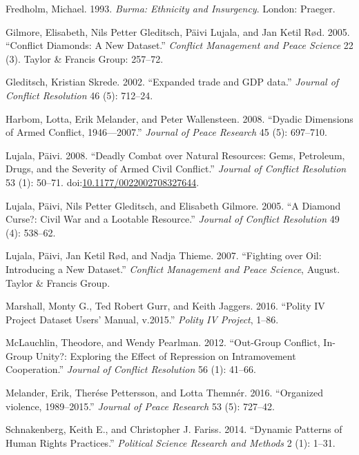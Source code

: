 \documentclass[12pt,]{book}
\theoremstyle{definition}
\theoremstyle{definition}
\theoremstyle{remark}
\begin{document}
\hypertarget{ref-Fredholm1993}{}
Fredholm, Michael. 1993. \emph{Burma: Ethnicity and Insurgency}. London:
Praeger.

\hypertarget{ref-Gilmore2007}{}
Gilmore, Elisabeth, Nils Petter Gleditsch, Päivi Lujala, and Jan Ketil
Rød. 2005. ``Conflict Diamonds: A New Dataset.'' \emph{Conflict
Management and Peace Science} 22 (3). Taylor \& Francis Group: 257--72.

\hypertarget{ref-Gleditsch2002b}{}
Gleditsch, Kristian Skrede. 2002. ``Expanded trade and GDP data.''
\emph{Journal of Conflict Resolution} 46 (5): 712--24.

\hypertarget{ref-Harbom2008}{}
Harbom, Lotta, Erik Melander, and Peter Wallensteen. 2008. ``Dyadic
Dimensions of Armed Conflict, 1946---2007.'' \emph{Journal of Peace
Research} 45 (5): 697--710.

\hypertarget{ref-Lujala2008}{}
Lujala, Päivi. 2008. ``Deadly Combat over Natural Resources: Gems,
Petroleum, Drugs, and the Severity of Armed Civil Conflict.''
\emph{Journal of Conflict Resolution} 53 (1): 50--71.
doi:\href{https://doi.org/10.1177/0022002708327644}{10.1177/0022002708327644}.

\hypertarget{ref-Lujala2005}{}
Lujala, Päivi, Nils Petter Gleditsch, and Elisabeth Gilmore. 2005. ``A
Diamond Curse?: Civil War and a Lootable Resource.'' \emph{Journal of
Conflict Resolution} 49 (4): 538--62.

\hypertarget{ref-Lujala2007}{}
Lujala, Päivi, Jan Ketil Rød, and Nadja Thieme. 2007. ``Fighting over
Oil: Introducing a New Dataset.'' \emph{Conflict Management and Peace
Science}, August. Taylor \& Francis Group.

\hypertarget{ref-Marshall2016}{}
Marshall, Monty G., Ted Robert Gurr, and Keith Jaggers. 2016. ``Polity
IV Project Dataset Users' Manual, v.2015.'' \emph{Polity IV Project},
1--86.

\hypertarget{ref-McLauchlin2012}{}
McLauchlin, Theodore, and Wendy Pearlman. 2012. ``Out-Group Conflict,
In-Group Unity?: Exploring the Effect of Repression on Intramovement
Cooperation.'' \emph{Journal of Conflict Resolution} 56 (1): 41--66.

\hypertarget{ref-Melander2016}{}
Melander, Erik, Therése Pettersson, and Lotta Themnér. 2016. ``Organized
violence, 1989--2015.'' \emph{Journal of Peace Research} 53 (5):
727--42.

\hypertarget{ref-Schnakenberg2014}{}
Schnakenberg, Keith E., and Christopher J. Fariss. 2014. ``Dynamic
Patterns of Human Rights Practices.'' \emph{Political Science Research
and Methods} 2 (1): 1--31.
\end{document}
